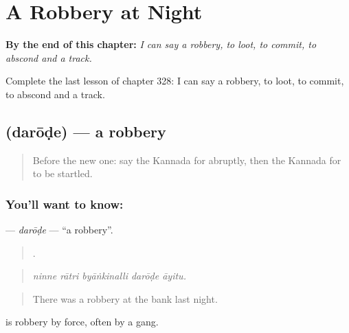 
\chapter{A Robbery at Night}
\label{ch:ka-a-robbery-at-night}

\begin{chapteropening}
\textbf{By the end of this chapter:} \emph{I can say a robbery, to loot, to commit, to abscond and a track.}

Complete the last lesson of chapter 328: I can say a robbery, to loot, to commit, to abscond and a track.
\end{chapteropening}

\section[\texorpdfstring{\kn{ದರೋಡೆ} (darōḍe)}{ದರೋಡೆ (darōḍe)}]{ (darōḍe) — a robbery}

\label{lesson:KA-C328-darode}



\begin{quote}
Before the new one: say the Kannada for abruptly, then the Kannada for to be startled.
\end{quote}

\subsection*{You'll want to know: }
\textbf{} — \emph{darōḍe} — \textquotedblleft{}a robbery\textquotedblright{}.

\begin{quote}
    .
\end{quote}

\begin{quote}
\emph{ninne rātri byāṅkinalli darōḍe āyitu.}
\end{quote}

\begin{quote}
There was a robbery at the bank last night.
\end{quote}

 is robbery by force, often by a gang.


